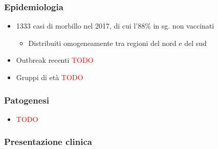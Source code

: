 \documentclass[italian,]{article}
\providecommand{\tightlist}{%
  \setlength{\itemsep}{0pt}\setlength{\parskip}{0pt}}
\newcommand{\TODO}[1]{\textcolor{red}{\textsf{\footnotesize{TODO #1}}}} %
\begin{document}
\hypertarget{epidemiologia-2}{%
\subsubsection{Epidemiologia}\label{epidemiologia-2}}

\begin{itemize}
\tightlist
\item
  1333 casi di morbillo nel 2017, di cui l'88\% in sg. non vaccinati

  \begin{itemize}
  \tightlist
  \item
    Distribuiti omogeneamente tra regioni del nord e del sud
  \end{itemize}
\item
  Outbreak recenti \TODO{}
\item
  Gruppi di età \TODO{}
\end{itemize}

\hypertarget{patogenesi-10}{%
\subsubsection{Patogenesi}\label{patogenesi-10}}

\begin{itemize}
\item
  \TODO{}
\end{itemize}

\hypertarget{presentazione-clinica-2}{%
\subsubsection{Presentazione clinica}\label{presentazione-clinica-2}}
\end{document}
